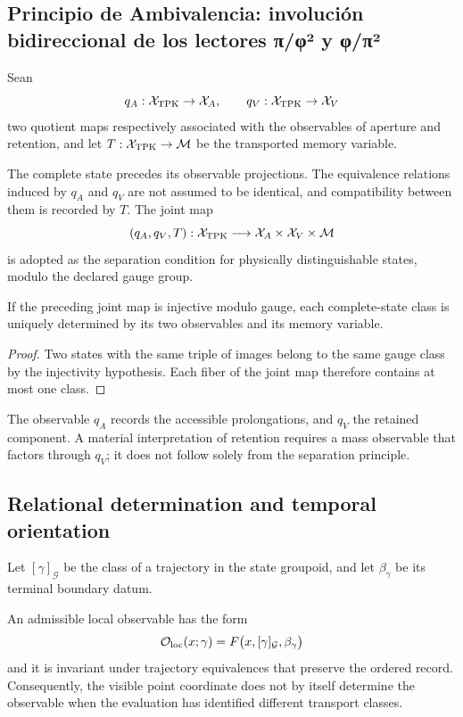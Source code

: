 \subsection{Principio de Ambivalencia: involución bidireccional de los lectores π/φ² y φ/π²}

Sean
\[
 q_A:\mathcal X_{\rm TPK}\to\mathcal X_A,
 \qquad
 q_V:\mathcal X_{\rm TPK}\to\mathcal X_V
\]
two quotient maps respectively associated with the observables of
aperture and retention, and let
\(T:\mathcal X_{\rm TPK}\to\mathcal M\) be the transported memory
variable.

\begin{principle}[Ambivalence]
The complete state precedes its observable projections. The equivalence
relations induced by \(q_A\) and \(q_V\) are not assumed to be identical, and
compatibility between them is recorded by \(T\). The joint map
\[
 (q_A,q_V,T):\mathcal X_{\rm TPK}
 \longrightarrow\mathcal X_A\times\mathcal X_V\times\mathcal M
\]
is adopted as the separation condition for physically distinguishable
states, modulo the declared gauge group.
\end{principle}

\begin{proposition}
If the preceding joint map is injective modulo gauge, each complete-state
class is uniquely determined by its two observables and its memory
variable.
\end{proposition}
\begin{proof}
Two states with the same triple of images belong to the same gauge class
by the injectivity hypothesis. Each fiber of the joint map
therefore contains at most one class.
\end{proof}

The observable \(q_A\) records the accessible prolongations, and \(q_V\) the
retained component. A material interpretation of retention requires a
mass observable that factors through \(q_V\); it does not follow solely from the
separation principle.

\subsection{Relational determination and temporal orientation}

Let \([\gamma]_{\mathcal G}\) be the class of a trajectory in the state groupoid, and
let \(\beta_\gamma\) be its terminal boundary datum.
\begin{principle}
An admissible local observable has the form
\[
 \mathcal O_{\rm loc}(x;\gamma)
 =F\bigl(x,[\gamma]_{\mathcal G},\beta_\gamma\bigr)
\]
and it is invariant under trajectory equivalences that preserve the
ordered record. Consequently, the visible point coordinate does not by itself
determine the observable when the evaluation has identified different
transport classes.
\end{principle}

